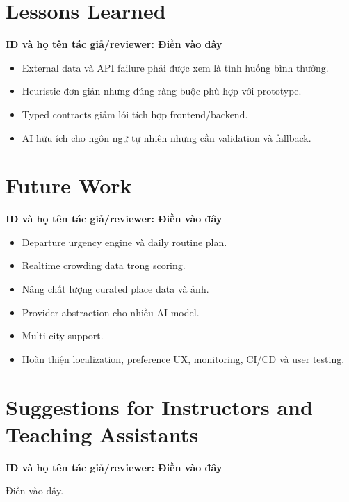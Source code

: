 \documentclass[12pt,a4paper,oneside]{report}
\newcommand{\tacgia}{%
  \begin{tcolorbox}[colback=blue!3,colframe=blue!25,boxrule=0.4pt,arc=1mm]
    \small\textbf{ID và họ tên tác giả/reviewer: Điền vào đây}
  \end{tcolorbox}
}
\begin{document}
\section{Lessons Learned}
\tacgia
\begin{itemize}
  \item External data và API failure phải được xem là tình huống bình thường.
  \item Heuristic đơn giản nhưng đúng ràng buộc phù hợp với prototype.
  \item Typed contracts giảm lỗi tích hợp frontend/backend.
  \item AI hữu ích cho ngôn ngữ tự nhiên nhưng cần validation và fallback.
\end{itemize}

\section{Future Work}
\tacgia
\begin{itemize}
  \item Departure urgency engine và daily routine plan.
  \item Realtime crowding data trong scoring.
  \item Nâng chất lượng curated place data và ảnh.
  \item Provider abstraction cho nhiều AI model.
  \item Multi-city support.
  \item Hoàn thiện localization, preference UX, monitoring, CI/CD và user testing.
\end{itemize}

\section{Suggestions for Instructors and Teaching Assistants}
\tacgia
Điền vào đây.
\end{document}
